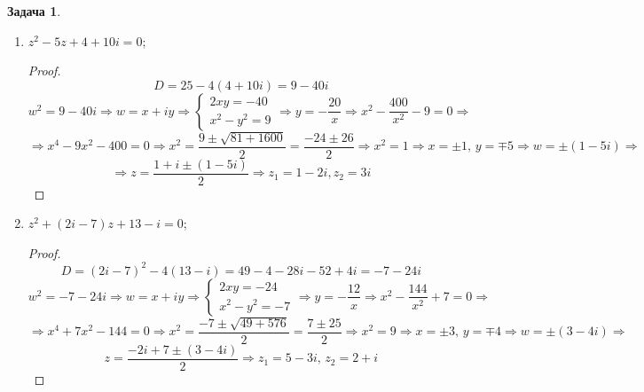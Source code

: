 \documentclass[12pt]{article}
\theoremstyle{definition}
\newtheorem{problem}{Задача}
\begin{document}
\begin{problem}
\begin{enumerate}[label=\asbuk*)]
\begin{proof}
			$$
				D = (1+i)^2 - 4(6 + 3i) = 1 -1 + 2i - 24 -12i = -24 - 10i 
			$$
			$$
				w^2 = -24 - 10i \Rightarrow w = x + iy \Rightarrow 					
				\begin{cases}
					2xy = -10\\
					x^2 - y^2 = -24
				\end{cases}  \Rightarrow
				y = - \dfrac{5}{x} \Rightarrow x^2 - \dfrac{25}{x^2} + 24 = 0 \Rightarrow
			$$
			$$
				\Rightarrow x^4 + 24x^2 - 25 = 0 \Rightarrow x^2 = \dfrac{-24 \pm \sqrt{4{\cdot}169}}{2} = \dfrac{-24 \pm 26}{2} \Rightarrow x^2 = 1 \Rightarrow  x = \pm 1, \, y = \mp 5 \Rightarrow w = \pm(1 - 5i) \Rightarrow
			$$
			$$
				\Rightarrow z = \dfrac{ 1 + i \pm (1 - 5i)}{2} \Rightarrow z_1 = 1 -2i, z_2 = 3i
			$$
		\end{proof}
		\item $z^2 - 5z + 4 + 10i = 0$;
		\begin{proof}
			$$
				D = 25 - 4(4 + 10i) = 9  - 40i 
			$$
			$$
				w^2 = 9 - 40i \Rightarrow w = x + iy \Rightarrow 					
				\begin{cases}
					2xy = -40\\
					x^2 - y^2 = 9
				\end{cases}  \Rightarrow
				y = - \dfrac{20}{x} \Rightarrow x^2 - \dfrac{400}{x^2} - 9 = 0 \Rightarrow
			$$
			$$
				\Rightarrow x^4 - 9x^2 - 400 = 0 \Rightarrow x^2 = \dfrac{9 \pm \sqrt{81 +1600}}{2} = \dfrac{-24 \pm 26}{2} \Rightarrow x^2 = 1 \Rightarrow  x = \pm 1, \, y = \mp 5 \Rightarrow w = \pm(1 - 5i) \Rightarrow
			$$
			$$
				\Rightarrow z = \dfrac{ 1 + i \pm (1 - 5i)}{2} \Rightarrow z_1 = 1 -2i, z_2 = 3i
			$$
		\end{proof}
		\item $z^2 +(2i - 7)z + 13 - i = 0$;
		\begin{proof}
			$$
				D = (2i - 7)^2 - 4(13- i) = 49 - 4 - 28i - 52 + 4i = -7 - 24i
			$$
			$$
				w^2 = -7 -24i \Rightarrow w = x + iy \Rightarrow 					
				\begin{cases}
					2xy = -24\\
					x^2 - y^2 = -7
				\end{cases}  \Rightarrow
				y = - \dfrac{12}{x} \Rightarrow x^2 - \dfrac{144}{x^2} + 7 = 0 \Rightarrow
			$$
			$$
				\Rightarrow x^4 + 7x^2 -144 = 0 \Rightarrow x^2 = \dfrac{-7 \pm \sqrt{49 + 576}}{2} = \dfrac{7 \pm25}{2} \Rightarrow x^2 = 9 \Rightarrow x = \pm 3, \, y = \mp 4 \Rightarrow w = \pm(3 - 4i) \Rightarrow
			$$
			$$
				z = \dfrac{-2i + 7 \pm(3-4i)}{2} \Rightarrow z_1 = 5 - 3i, \, z_2 = 2 + i
			$$
		\end{proof}
	\end{enumerate}
\end{problem}
\end{document}
